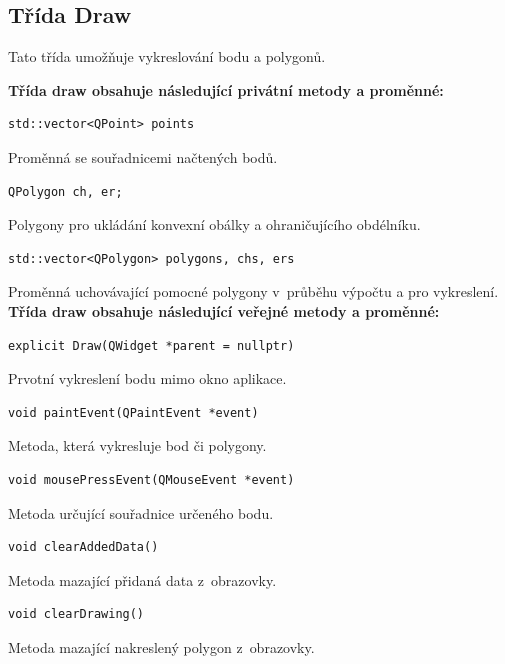 \documentclass[a4paper, 12pt, oneside, titlepage]{article} %
\begin{document}
    
    
\subsection{Třída Draw}
Tato třída umožňuje vykreslování bodu a polygonů.

\textbf{Třída draw obsahuje následující privátní metody a proměnné:}
\begin{verbatim}
std::vector<QPoint> points
\end{verbatim}
Proměnná se souřadnicemi načtených bodů.\\

\begin{verbatim}
QPolygon ch, er;
\end{verbatim}
Polygony pro ukládání konvexní obálky a ohraničujícího obdélníku.\\

\begin{verbatim}
std::vector<QPolygon> polygons, chs, ers
\end{verbatim}
Proměnná uchovávající pomocné polygony v~průběhu výpočtu a pro vykreslení.\\


\textbf{Třída draw obsahuje následující veřejné metody a proměnné:}
\begin{verbatim}
explicit Draw(QWidget *parent = nullptr)
\end{verbatim}
Prvotní vykreslení bodu mimo okno aplikace.\\

\begin{verbatim}
void paintEvent(QPaintEvent *event)
\end{verbatim}
Metoda, která vykresluje bod či polygony.\\

\begin{verbatim}
void mousePressEvent(QMouseEvent *event)
\end{verbatim}
Metoda určující souřadnice určeného bodu.\\

\begin{verbatim}
void clearAddedData()
\end{verbatim}
Metoda mazající přidaná data z~obrazovky.\\

\begin{verbatim}
void clearDrawing()
\end{verbatim}
Metoda mazající nakreslený polygon z~obrazovky.\\
\end{document}
